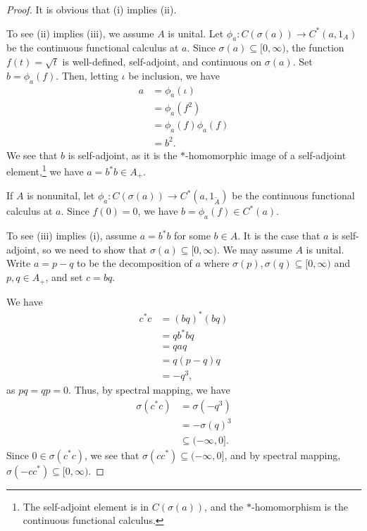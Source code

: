 \documentclass[10pt]{mypackage}
\begin{document}
\begin{proof}
  It is obvious that (i) implies (ii).\newline

  To see (ii) implies (iii), we assume $A$ is unital. Let $\phi_a\colon C\left(\sigma\left(a\right)\right)\rightarrow C^{\ast}\left(a,1_A\right)$ be the continuous functional calculus at $a$. Since $\sigma\left(a\right)\subseteq [0,\infty)$, the function $f\left(t\right) = \sqrt{t}$ is well-defined, self-adjoint, and continuous on $\sigma\left(a\right)$. Set $b = \phi_a\left(f\right)$. Then, letting $\iota$ be inclusion, we have
  \begin{align*}
    a &= \phi_a\left(\iota\right)\\
      &= \phi_a\left(f^2\right)\\
      &= \phi_a\left(f\right)\phi_a\left(f\right)\\
      &= b^2.
  \end{align*}
  We see that $b$ is self-adjoint, as it is the $\ast$-homomorphic image of a self-adjoint element,\footnote{The self-adjoint element is in $C\left(\sigma\left(a\right)\right)$, and the $\ast$-homomorphism is the continuous functional calculus.} we have $a = b^{\ast}b\in A_+$.\newline

  If $A$ is nonunital, let $\phi_a\colon C\left(\sigma\left(a\right)\right)\rightarrow C^{\ast}\left(a,1_{\widetilde{A}}\right)$ be the continuous functional calculus at $a$. Since $f(0) = 0$, we have $b = \phi_a\left(f\right)\in C^{\ast}\left(a\right)$.\newline

  To see (iii) implies (i), assume $a = b^{\ast}b$ for some $b\in A$. It is the case that $a$ is self-adjoint, so we need to show that $\sigma\left(a\right)\subseteq [0,\infty)$. We may assume $A$ is unital. Write $a = p-q$ to be the decomposition of $a$ where $\sigma\left(p\right),\sigma\left(q\right)\subseteq [0,\infty)$ and $p,q\in A_{+}$, and set $c = bq$.\newline

  We have
  \begin{align*}
    c^{\ast}c &= \left(bq\right)^{\ast}\left(bq\right)\\
              &= qb^{\ast}bq\\
              &= qaq\\
              &= q\left(p-q\right)q\\
              &= -q^3,
  \end{align*}
  as $pq = qp = 0$. Thus, by spectral mapping, we have
  \begin{align*}
    \sigma\left(c^{\ast}c\right) &= \sigma\left(-q^3\right)\\
                                 &= -\sigma\left(q\right)^3\\
                                 &\subseteq (-\infty,0].
  \end{align*}
  Since $0\in \sigma\left(c^{\ast}c\right)$, we see that $\sigma\left(cc^{\ast}\right)\subseteq (-\infty,0]$, and by spectral mapping, $\sigma\left(-cc^{\ast}\right)\subseteq [0,\infty)$.\newline


\end{proof}
\end{document}
